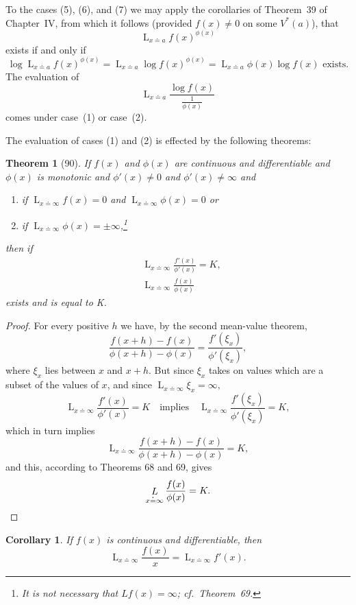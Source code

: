 \documentclass[a4paper,12pt]{book}[2004/02/16]
\providecommand{\hyperlink}[2]{#2}
\providecommand{\hypertarget}[2]{#2}
\theoremstyle{ilemma}
\theoremstyle{itheorem}
\newtheorem{theorem}{Theorem}
\theoremstyle{iother}
\theoremstyle{icorollary}
\newtheorem{corollary}{Corollary}
\theoremstyle{numcorollary}
\theoremstyle{idefinition}
\renewcommand{\dfrac}[2]{\frac{#1}{#2}}%
\begin{document}
To the cases \hyperlink{case5}{(5)}, \hyperlink{case6}{(6)}, and \hyperlink{case7}{(7)} we may apply the corollaries of
Theorem~\hyperlink{thm39}{39} of Chapter~\hyperlink{chapIV}{IV}, from which it follows (provided $f(x) \neq
0$ on some $V^*(a)$), that
\[
  \mathop{L}_{x\doteq a} f(x)^{\phi(x)}
\]
exists if and only if
\[
  \log \mathop{L}_{x\doteq a} f(x)^{\phi(x)}
= \mathop{L}_{x \doteq a} \log f(x)^{\phi(x)}
= \mathop{L}_{x\doteq a} \phi(x) \log f(x) \text{ exists.}
\]
The evaluation of
\[
  \mathop{L}_{x \doteq a} \frac{\log f(x)}{\dfrac{1}{\phi(x)}}
\]
comes under case~\hyperlink{case1}{(1)} or case~\hyperlink{case2}{(2)}.

The evaluation of cases \hyperlink{case1}{(1)} and \hyperlink{case2}{(2)} is effected by the following
theorems:

\begin{theorem}[90]\hypertarget{thm90}{}
If $f(x)$ and $\phi(x)$ are continuous and differentiable and
$\phi(x)$ is monotonic and $\phi'(x) \neq 0$ and $\phi'(x)\neq \infty$
and
\begin{enumerate}
\item[\textnormal{(1)}] if $\displaystyle \mathop{L}_{x \doteq \infty} f(x)=0$ and
 $\displaystyle \mathop{L}_{x \doteq \infty} \phi(x)=0$ or
\item[\textnormal{(2)}] if $\displaystyle\mathop{L}_{x \doteq \infty} \phi(x) =
  \pm\infty$,\footnote{%
  It is not necessary that $Lf(x)=\infty$; cf.\ Theorem~\hyperlink{thm69}{69}.}
\end{enumerate}
then if
\begin{align*}
  &\mathop{L}_{x \doteq \infty} \frac{f'(x)}{\phi'(x)} = K,\\
  &\mathop{L}_{x \doteq \infty} \frac{f(x)}{\phi(x)}
\end{align*}
exists and is equal to K.
\end{theorem}

\begin{proof}
For every positive $h$ we have, by the second mean-value theorem,
\[
  \frac{f(x+h)-f(x)}{\phi(x+h)-\phi(x)} =
  \frac{f'(\xi_x)}{\phi'(\xi_x)},
\]
where $\xi_x$ lies between $x$ and $x+h$. But since $\xi_x$ takes on
values which are a subset of the values of $x$, and since
$\displaystyle\mathop{L}_{x\doteq\infty} \xi_x = \infty,$
\[
  \mathop{L}_{x \doteq \infty} \frac{f'(x)}{\phi'(x)} = K \quad
  \text{implies} \quad \mathop{L}_{x \doteq \infty}
  \frac{f'(\xi_x)}{\phi'(\xi_x)} = K,
\]
which in turn implies
\[
  \mathop{L}_{x \doteq \infty}
  \dfrac{f(x+h)-f(x)}{\phi(x+h)-\phi(x)}=K,
\]
and this, according to Theorems \hyperlink{thm68}{68} and \hyperlink{thm69}{69}, gives
\[
  \mathop{L}_{x \doteq \infty} \frac{f(x)}{\phi(x)} = K.\qedhere
\]
\end{proof}
\begin{corollary}
If $f(x)$ is continuous and differentiable, then
\[
  \mathop{L}_{x \doteq \infty} \frac{f(x)}{x} =
  \mathop{L}_{x \doteq \infty} f'(x).
\]
\end{corollary}
\end{document}
